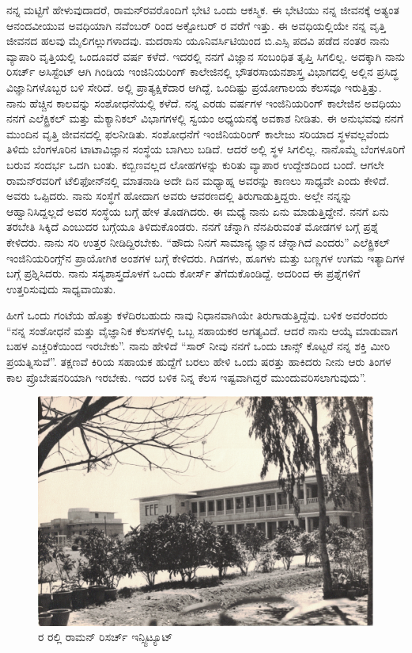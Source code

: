 ನನ್ನ ಮಟ್ಟಿಗೆ ಹೇಳುವುದಾದರೆ, ರಾಮನ್‍ರವರೊಂದಿಗೆ ಭೇಟಿ ಒಂದು ಆಕಸ್ಮಿಕ. ಈ ಭೇಟಿಯು ನನ್ನ ಜೀವನಕ್ಕೆ ಅತ್ಯಂತ ಆನಂದವೀಯುವ ಅವಧಿಯಾಗಿ ನವೆಂಬರ್ ರಿಂದ ಅಕ್ಟೋಬರ್ ರ ವರೆಗೆ ಇತ್ತು. ಈ ಅವಧಿಯಲ್ಲಿಯೇ ನನ್ನ ವೃತ್ತಿ ಜೀವನದ ಹಲವು ಮೈಲಿಗಲ್ಲುಗಳಾದವು. ಮದರಾಸು ಯೂನಿವರ್ಸಿಟಿಯಿಂದ ಬಿ.ಎಸ್ಸಿ ಪದವಿ ಪಡೆದ ನಂತರ ನಾನು ವ್ಯಾಪಾರಿ ವೃತ್ತಿಯಲ್ಲಿ ಒಂದೂವರೆ ವರ್ಷ ಕಳೆದೆ. ಇದರಲ್ಲಿ ನನಗೆ ವಿಜ್ಞಾನ ಸಂಬಂಧಿತ ತೃಪ್ತಿ ಸಿಗಲಿಲ್ಲ. ಅದಕ್ಕಾಗಿ ನಾನು ರಿಸರ್ಚ್ ಅಸಿಸ್ಟೆಂಟ್ ಆಗಿ ಗಿಂಡಿಯ ಇಂಜಿನಿಯರಿಂಗ್ ಕಾಲೇಜಿನಲ್ಲಿ ಭೌತರಸಾಯನಶಾಸ್ತ್ರ ವಿಭಾಗದಲ್ಲಿ ಅಲ್ಲಿನ ಪ್ರಸಿದ್ಧ ವಿಜ್ಞಾನಿಗಳೊಬ್ಬರ ಬಳಿ ಸೇರಿದೆ. ಅಲ್ಲಿ ಪ್ರಾತ್ಯಕ್ಷಿಕೆದಾರ ಆಗಿದ್ದೆ. ಒಂದಿಷ್ಟು ಪ್ರಯೋಗಾಲಯ ಕೆಲಸವೂ ಇರುತ್ತಿತ್ತು. ನಾನು ಹೆಚ್ಚಿನ ಕಾಲವನ್ನು ಸಂಶೋಧನೆಯಲ್ಲಿ ಕಳೆದೆ. ನನ್ನ ಎರಡು ವರ್ಷಗಳ ಇಂಜಿನಿಯರಿಂಗ್ ಕಾಲೇಜಿನ ಅವಧಿಯು ನನಗೆ ಎಲೆಕ್ಟ್ರಿಕಲ್ ಮತ್ತು ಮೆಕ್ಯಾನಿಕಲ್ ವಿಭಾಗಗಳಲ್ಲಿ ಸ್ವಯಂ ಅಧ್ಯಯನಕ್ಕೆ ಅವಕಾಶ ನೀಡಿತು. ಈ ಅನುಭವವು ನನಗೆ ಮುಂದಿನ ವೃತ್ತಿ ಜೀವನದಲ್ಲಿ ಫಲನೀಡಿತು. ಸಂಶೋಧನೆಗೆ ಇಂಜಿನಿಯರಿಂಗ್ ಕಾಲೇಜು ಸರಿಯಾದ ಸ್ಥಳವಲ್ಲವೆಂದು ತಿಳಿದು ಬೆಂಗಳೂರಿನ ಟಾಟಾವಿಜ್ಞಾನ ಸಂಸ್ಥೆಯ ಬಾಗಿಲು ಬಡಿದೆ. ಆದರೆ ಅಲ್ಲಿ ಸ್ಥಳ ಸಿಗಲಿಲ್ಲ. ನಾನೊಮ್ಮೆ ಬೆಂಗಳೂರಿಗೆ ಬರುವ ಸಂದರ್ಭ ಒದಗಿ ಬಂತು. ಕಬ್ಬಿಣವಲ್ಲದ ಲೋಹಗಳನ್ನು ಕುರಿತು ವ್ಯಾಪಾರ ಉದ್ದೇಶದಿಂದ ಬಂದೆ. ಆಗಲೇ ರಾಮನ್‍ರವರಿಗೆ ಟೆಲಿಫೋನ್‍ನಲ್ಲಿ ಮಾತನಾಡಿ ಅದೇ ದಿನ ಮಧ್ಯಾಹ್ನ ಅವರನ್ನು ಕಾಣಲು ಸಾಧ್ಯವೇ ಎಂದು ಕೇಳಿದೆ. ಅವರು ಒಪ್ಪಿದರು. ನಾನು ಸಂಸ್ಥೆಗೆ ಹೋದಾಗ ಅವರು ಆವರಣದಲ್ಲಿ ತಿರುಗಾಡುತ್ತಿದ್ದರು. ಅಲ್ಲೇ ನನ್ನನ್ನು ಆಹ್ವಾನಿಸಿದ್ದಲ್ಲದೆ ಅವರ ಸಂಸ್ಥೆಯ ಬಗ್ಗೆ ಹೇಳ ತೊಡಗಿದರು. ಈ ಮಧ್ಯೆ ನಾನು ಏನು ಮಾಡುತ್ತಿದ್ದೇನೆ. ನನಗೆ ಏನು ತರಬೇತಿ ಸಿಕ್ಕಿದೆ ಎಂಬುದರ ಬಗ್ಗೆಯೂ ತಿಳಿದುಕೊಂಡರು. ನನಗೆ ಚೆನ್ನಾಗಿ ನೆನಪಿರುವಂತೆ ಮೋಡಗಳ ಬಗ್ಗೆ ಪ್ರಶ್ನೆ ಕೇಳಿದರು. ನಾನು ಸರಿ ಉತ್ತರ ನೀಡಿದ್ದಿರಬೇಕು. “ಹೌದು ನಿನಗೆ ಸಾಮಾನ್ಯ ಜ್ಞಾನ ಚೆನ್ನಾಗಿದೆ ಎಂದರು” ಎಲೆಕ್ಟ್ರಿಕಲ್ ಇಂಜಿನಿಯರಿಂಗ್ಸ್‌ನ ಪ್ರಾಯೋಗಿಕ ಅಂಶಗಳ ಬಗ್ಗೆ ಕೇಳಿದರು. ಗಿಡಗಳು, ಹೂಗಳು ಮತ್ತು ಬಣ್ಣಗಳ ಉಗಮ ಇತ್ಯಾದಿಗಳ ಬಗ್ಗೆ ಪ್ರಶ್ನಿಸಿದರು. ನಾನು ಸಸ್ಯಶಾಸ್ತ್ರದೊಳಗೆ ಒಂದು ಕೋರ್ಸ್ ತೆಗೆದುಕೊಂಡಿದ್ದೆ. ಅದರಿಂದ ಈ ಪ್ರಶ್ನೆಗಳಿಗೆ ಉತ್ತರಿಸುವುದು ಸಾಧ್ಯವಾಯಿತು.

ಹೀಗೆ ಒಂದು ಗಂಟೆಯ ಹೊತ್ತು ಕಳೆದಿರಬಹುದು ನಾವು ನಿಧಾನವಾಗಿಯೇ ತಿರುಗಾಡುತ್ತಿದ್ದೆವು. ಬಳಿಕ ಅವರೆಂದರು \enginline{-} “ನನ್ನ ಸಂಶೋಧನೆ ಮತ್ತು ವೈಜ್ಞಾನಿಕ ಕೆಲಸಗಳಲ್ಲಿ ಒಬ್ಬ ಸಹಾಯಕರ ಅಗತ್ಯವಿದೆ. ಆದರೆ ನಾನು ಆಯ್ಕೆ ಮಾಡುವಾಗ ಬಹಳ ಎಚ್ಚರಿಕೆಯಿಂದ ಇರಬೇಕು”. ನಾನು ಹೇಳಿದೆ “ಸಾರ್ ನೀವು ನನಗೆ ಒಂದು ಚಾನ್ಸ್ ಕೊಟ್ಟರೆ ನನ್ನ ಶಕ್ತಿ ಮೀರಿ ಪ್ರಯತ್ನಿಸುವೆ”. ತಕ್ಷಣವೆ ಕಿರಿಯ ಸಹಾಯಕ ಹುದ್ದೆಗೆ ಬರಲು ಹೇಳಿ ಒಂದು ಷರತ್ತು ಹಾಕಿದರು \enginline{-} ನೀನು ಆರು ತಿಂಗಳ ಕಾಲ ಪ್ರೊಬೇಷನರಿಯಾಗಿ ಇರಬೇಕು. ಇದರ ಬಳಿಕ ನಿನ್ನ ಕೆಲಸ ಇಷ್ಟವಾಗಿದ್ದರೆ ಮುಂದುವರಿಸಲಾಗುವುದು”.

\begin{figure}
\includegraphics{"images/7.jpg"}
\caption{ರ ರಲ್ಲಿ ರಾಮನ್ ರಿಸರ್ಚ್ ಇನ್ಸ್ಟಿಟ್ಯೂಟ್}
\end{figure}

